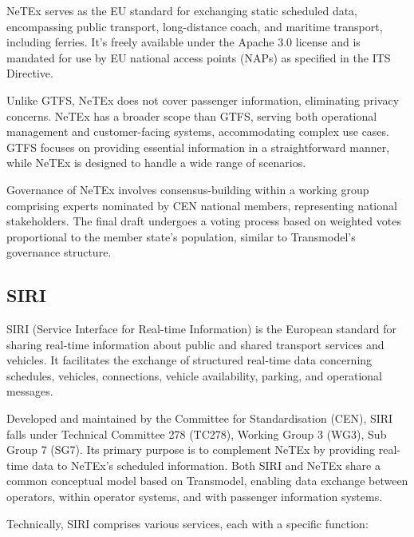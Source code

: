 \documentclass[12pt]{report}
\begin{document}
	\newpage
	NeTEx serves as the EU standard for exchanging static scheduled data, encompassing public transport, long-distance coach, and maritime transport, including ferries. It's freely available under the Apache 3.0 license and is mandated for use by EU national access points (NAPs) as specified in the ITS Directive.
	
	Unlike GTFS, NeTEx does not cover passenger information, eliminating privacy concerns. NeTEx has a broader scope than GTFS, serving both operational management and customer-facing systems, accommodating complex use cases. GTFS focuses on providing essential information in a straightforward manner, while NeTEx is designed to handle a wide range of scenarios.
	
	Governance of NeTEx involves consensus-building within a working group comprising experts nominated by CEN national members, representing national stakeholders. The final draft undergoes a voting process based on weighted votes proportional to the member state's population, similar to Transmodel's governance structure.
	
	\subsection{SIRI}
	
	SIRI (Service Interface for Real-time Information) is the European standard for sharing real-time information about public and shared transport services and vehicles. It facilitates the exchange of structured real-time data concerning schedules, vehicles, connections, vehicle availability, parking, and operational messages.
	
	Developed and maintained by the Committee for Standardisation (CEN), SIRI falls under Technical Committee 278 (TC278), Working Group 3 (WG3), Sub Group 7 (SG7). Its primary purpose is to complement NeTEx by providing real-time data to NeTEx's scheduled information. Both SIRI and NeTEx share a common conceptual model based on Transmodel, enabling data exchange between operators, within operator systems, and with passenger information systems.
	
	Technically, SIRI comprises various services, each with a specific function:
	
\end{document}
